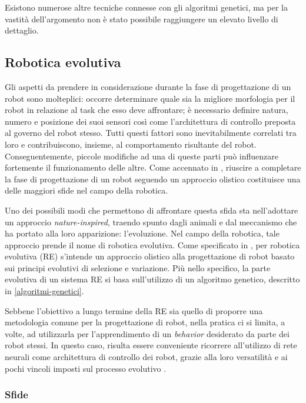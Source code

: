 \documentclass[a4paper,12pt]{article}
\begin{document}
Esistono numerose altre tecniche connesse con gli algoritmi genetici, ma per la vastità dell'argomento non è stato possibile raggiungere un elevato livello di dettaglio.

\subsection*{Robotica evolutiva}

Gli aspetti da prendere in considerazione durante la fase di progettazione di un robot sono molteplici: occorre determinare quale sia la migliore morfologia per il robot in relazione al task che esso deve affrontare; è necessario definire natura, numero e posizione dei suoi sensori così come l'architettura di controllo preposta al governo del robot stesso. Tutti questi fattori sono inevitabilmente correlati tra loro e contribuiscono, insieme, al comportamento risultante del robot. Conseguentemente, piccole modifiche ad una di queste parti può influenzare fortemente il funzionamento delle altre. Come accennato in \cite{ERWWW}, riuscire a completare la fase di progettazione di un robot seguendo un approccio olistico costituisce una delle maggiori sfide nel campo della robotica.  

Uno dei possibili modi che permettono di affrontare questa sfida sta nell'adottare un approccio \emph{nature-inspired}, traendo spunto dagli animali e dal meccanismo che ha portato alla loro apparizione: l'evoluzione. Nel campo della robotica, tale approccio prende il nome di robotica evolutiva. Come specificato in \cite{ERNolfi}, per robotica evolutiva (RE) s'intende un approccio olistico alla progettazione di robot basato sui principi evolutivi di selezione e variazione. Più nello specifico, la parte evolutiva di un sistema RE si basa sull'utilizzo di un algoritmo genetico, descritto in \autoref{algoritmi-genetici}. 

Sebbene l'obiettivo a lungo termine della RE sia quello di proporre una metodologia comune per la progettazione di robot, nella pratica ci si limita, a volte, ad utilizzarla per l'apprendimento di un \emph{behavior} desiderato da parte dei robot stessi. In questo caso, risulta essere conveniente ricorrere all'utilizzo di rete neurali come architettura di controllo dei robot, grazie alla loro versatilità e ai pochi vincoli imposti sul processo evolutivo \cite{ERWWW}.

\subsubsection*{Sfide}
\end{document}
